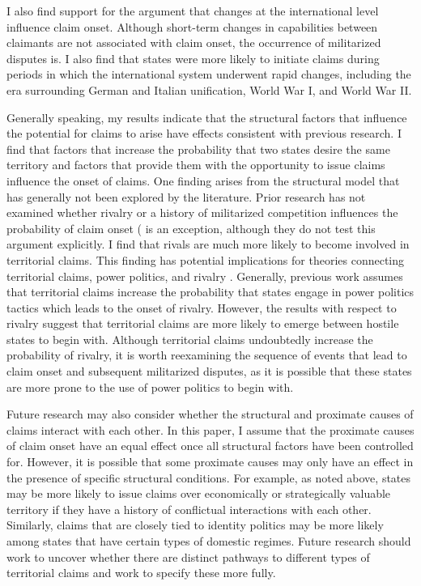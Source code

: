 
I also find support for the argument that changes at the international level influence claim onset. Although short-term changes in capabilities between claimants are not associated with claim onset, the occurrence of militarized disputes is. I also find that states were more likely to initiate claims during periods in which the international system underwent rapid changes, including the era surrounding German and Italian unification, World War I, and World War II.


Generally speaking, my results indicate that the structural factors that influence the potential for claims to arise have effects consistent with previous research. I find that factors that increase the probability that two states desire the same territory and factors that provide them with the opportunity to issue claims influence the onset of claims. One finding arises from the structural model that has generally not been explored by the literature. Prior research has not examined whether rivalry or a history of militarized competition influences the probability of claim onset (\citet{rasler2006} is an exception, although they do not test this argument explicitly. I find that rivals are much more likely to become involved in territorial claims. This finding has potential implications for theories connecting territorial claims, power politics, and rivalry \citep{senese2008, vasquez2009}. Generally, previous work assumes that territorial claims increase the probability that states engage in power politics tactics which leads to the onset of rivalry. However, the results with respect to rivalry suggest that territorial claims are more likely to emerge between hostile states to begin with. Although territorial claims undoubtedly increase the probability of rivalry, it is worth reexamining the sequence of events that lead to claim onset and subsequent militarized disputes, as it is possible that these states are more prone to the use of power politics to begin with.


Future research may also consider whether the structural and proximate causes of claims interact with each other. In this paper, I assume that the proximate causes of claim onset have an equal effect once all structural factors have been controlled for. However, it is possible that some proximate causes may only have an effect in the presence of specific structural conditions. For example, as noted above, states may be more likely to issue claims over economically or strategically valuable territory if they have a history of conflictual interactions with each other. Similarly, claims that are closely tied to identity politics may be more likely among states that have certain types of domestic regimes. Future research should work to uncover whether there are distinct pathways to different types of territorial claims and work to specify these more fully.

